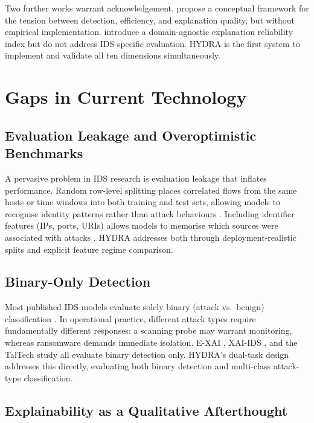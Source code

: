 \documentclass[12pt,a4paper]{report}
\begin{document}
Two further works warrant acknowledgement. \cite{adadi2018} propose a conceptual framework for the tension between detection, efficiency, and explanation quality, but without empirical implementation. \cite{sengupta2026} introduce a domain-agnostic explanation reliability index but do not address IDS-specific evaluation. HYDRA is the first system to implement and validate all ten dimensions simultaneously.

\section{Gaps in Current Technology}
\label{sec:gaps}

\subsection{Evaluation Leakage and Overoptimistic Benchmarks}
\label{sec:leakage-gap}

A pervasive problem in IDS research is evaluation leakage that inflates performance. Random row-level splitting places correlated flows from the same hosts or time windows into both training and test sets, allowing models to recognise identity patterns rather than attack behaviours \cite{lanvin2022}. Including identifier features (IPs, ports, URIs) allows models to memorise which sources were associated with attacks \cite{tareq2022}. HYDRA addresses both through deployment-realistic splits and explicit feature regime comparison.

\subsection{Binary-Only Detection}
\label{sec:binary-only}

Most published IDS models evaluate solely binary (attack vs.\ benign) classification \cite{aldweesh2020,shtayat2023}. In operational practice, different attack types require fundamentally different responses: a scanning probe may warrant monitoring, whereas ransomware demands immediate isolation. E-XAI \cite{arreche2024}, XAI-IDS \cite{arreche2024b}, and the TalTech study \cite{kalakoti2025} all evaluate binary detection only. HYDRA's dual-task design addresses this directly, evaluating both binary detection and multi-class attack-type classification.

\subsection{Explainability as a Qualitative Afterthought}
\label{sec:xai-afterthought}
\end{document}
